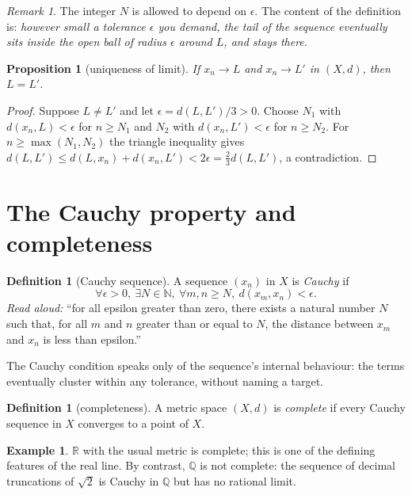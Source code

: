 \documentclass[11pt]{article}
\newtheorem{proposition}[theorem]{Proposition}
\theoremstyle{definition}
\newtheorem{definition}[theorem]{Definition}
\newtheorem{example}[theorem]{Example}
\theoremstyle{remark}
\newtheorem{remark}[theorem]{Remark}
\begin{document}
\begin{remark}
The integer $N$ is allowed to depend on $\epsilon$. The
content of the definition is: \emph{however small a tolerance
$\epsilon$ you demand, the tail of the sequence eventually
sits inside the open ball of radius $\epsilon$ around $L$,
and stays there.}
\end{remark}

\begin{proposition}[uniqueness of limit]
If $x_n \to L$ and $x_n \to L'$ in $(X, d)$, then $L = L'$.
\end{proposition}

\begin{proof}
Suppose $L \ne L'$ and let $\epsilon = d(L, L')/3 > 0$. Choose
$N_1$ with $d(x_n, L) < \epsilon$ for $n \ge N_1$ and $N_2$
with $d(x_n, L') < \epsilon$ for $n \ge N_2$. For
$n \ge \max(N_1, N_2)$ the triangle inequality gives
$d(L, L') \le d(L, x_n) + d(x_n, L') < 2\epsilon =
\tfrac{2}{3} d(L, L')$, a contradiction.
\end{proof}

\section{The Cauchy property and completeness}

\begin{definition}[Cauchy sequence]
A sequence $(x_n)$ in $X$ is \emph{Cauchy} if
\[
\forall \epsilon > 0,\ \exists N \in \mathbb{N},\
\forall m, n \ge N,\ d(x_m, x_n) < \epsilon.
\]
\emph{Read aloud:} ``for all epsilon greater than zero, there
exists a natural number $N$ such that, for all $m$ and $n$
greater than or equal to $N$, the distance between $x_m$ and
$x_n$ is less than epsilon.''
\end{definition}

The Cauchy condition speaks only of the sequence's internal
behaviour: the terms eventually cluster within any tolerance,
without naming a target.

\begin{definition}[completeness]
A metric space $(X, d)$ is \emph{complete} if every Cauchy
sequence in $X$ converges to a point of $X$.
\end{definition}

\begin{example}
$\mathbb{R}$ with the usual metric is complete; this is one
of the defining features of the real line. By contrast,
$\mathbb{Q}$ is not complete: the sequence of decimal
truncations of $\sqrt{2}$ is Cauchy in $\mathbb{Q}$ but has
no rational limit.
\end{example}
\end{document}
